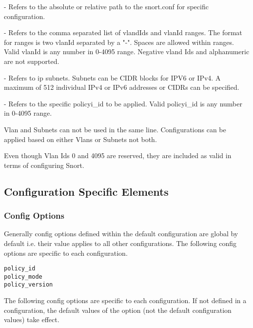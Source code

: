 \documentclass[english]{report}
\newenvironment{note}{
\samepage
    \vspace{10pt}{\textsf{
        {\hspace{7pt}\Huge{$\triangle$\hspace{-12.5pt}{\Large{$^!$}}}}\hspace{5pt}
        {\Large{NOTE}}
    }
    }
   \begin{center}
    \par\vspace{-17pt}

    \begin{lrbox}{\savepar}
    \begin{minipage}[r]{6in}
}
{
    \end{minipage}
    \end{lrbox}
    \fbox{
        \usebox{
            \savepar
	}
    }
    \par\vskip10pt
    \end{center}
}
\newenvironment{note}{
        \begin{rawhtml}
        <p><table border="1"><tr><td><b>
        Note:&nbsp;&nbsp;</b>
        \end{rawhtml}
}{
        \begin{rawhtml}
        </b></td></tr></table></p>
        \end{rawhtml}
}
\begin{document}
\begin{description}{}

\item [\texttt{path\_to\_snort.conf}] - Refers to the absolute or relative path to 
the snort.conf for specific configuration.

\item [\texttt{vlanIdList}] - Refers to the comma separated list of vlandIds and 
vlanId ranges. The format for ranges is two vlanId separated by a "-". Spaces are 
allowed within ranges. Valid vlanId is any number in 0-4095 range. Negative vland 
Ids and alphanumeric are not supported.

\item [\texttt{ipList}] - Refers to ip subnets. Subnets can be CIDR blocks for 
IPV6 or IPv4.  A maximum of 512 individual IPv4 or IPv6 addresses or CIDRs can be
specified.

\item [\texttt{policy\_id}] - Refers to the specific policyi\_id to be applied. Valid policyi\_id is any number in 0-4095 range.
\end{description}

\begin{note}
Vlan and Subnets can not be used in the same line. Configurations can be applied 
based on either Vlans or Subnets not both.
\end{note}

\begin{note}
Even though Vlan Ids 0 and 4095 are reserved, they are included as valid in terms
of configuring Snort.
\end{note}

\subsection{Configuration Specific Elements}

\subsubsection{Config Options}
Generally config options defined within the default configuration are global by 
default i.e. their value applies to all other configurations. The following config 
options are specific to each configuration.

\begin{verbatim}
policy_id
policy_mode
policy_version
\end{verbatim}

The following config options are specific to each configuration. If not defined in 
a configuration, the default values of the option (not the default configuration 
values) take effect.
\end{document}

